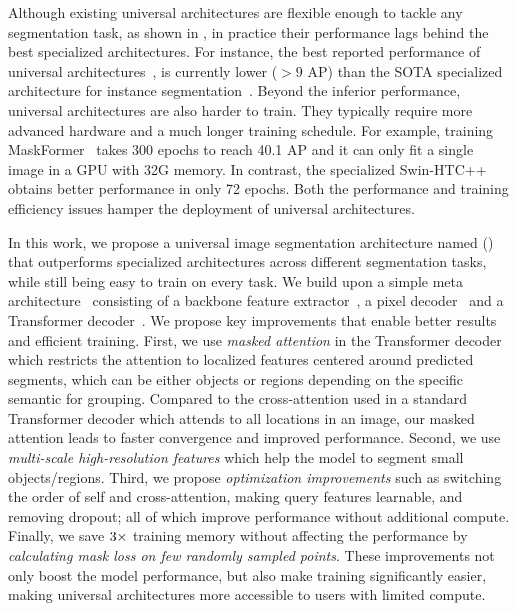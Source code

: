 Although existing universal architectures are flexible enough to tackle any segmentation task, %
as shown in , in practice their performance %
lags behind the best specialized architectures.
For instance, the best reported performance of universal architectures~\cite{cheng2021maskformer,zhang2021knet}, is currently lower ($>9$ AP) than the SOTA specialized architecture for instance segmentation~\cite{chen2019hybrid}.
Beyond the inferior performance, universal architectures are also harder to train. They typically require more advanced hardware and a much longer training schedule. For example, training MaskFormer~\cite{cheng2021maskformer} takes 300 epochs to reach 40.1 AP and it can only fit a single image in a GPU with 32G memory. In contrast, the specialized Swin-HTC++~\cite{chen2019hybrid} obtains better performance in only 72 epochs. Both the performance and training efficiency issues hamper the deployment of universal architectures.


In this work, we propose a universal image segmentation architecture named \modelnamelong (\textbf{\modelname}) that outperforms specialized architectures across different segmentation tasks, while still being easy to train on every task.
We build upon a simple meta architecture~\cite{cheng2021maskformer} consisting of a
backbone feature extractor~\cite{he2016deep,liu2021swin}, a pixel decoder~\cite{lin2016feature} and a Transformer decoder~\cite{vaswani2017attention}.
We propose key improvements that enable better results and efficient training.
First, we use \emph{masked attention} in the Transformer decoder which restricts the attention to localized features centered around predicted segments, which can be either objects or regions depending on the specific semantic for grouping.
Compared to the  cross-attention used in a standard Transformer decoder which attends to all locations in an image, our masked attention leads to faster convergence and improved performance.
Second, we use \emph{multi-scale high-resolution features} which help the model to segment small objects/regions.
Third, we propose \emph{optimization improvements} such as switching the order of self and cross-attention, making query features learnable, and removing dropout; all of which improve performance without additional compute.
Finally, we save $3\times$ training memory without affecting the performance by \emph{calculating mask loss on few randomly sampled points}.
These improvements not only boost the model performance, but also make training significantly easier, making universal architectures more accessible to users with limited compute.

